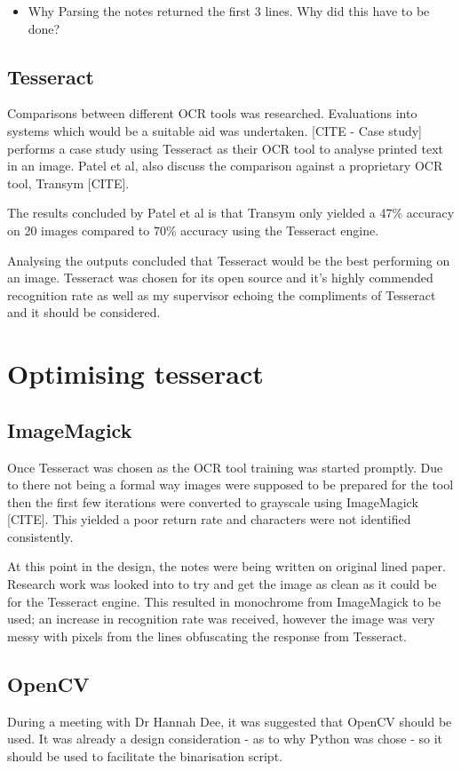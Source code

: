 \begin{itemize}
  \item Why Parsing the notes returned the first 3 lines. Why did this have to be done?

\end{itemize}

\subsection{Tesseract}
Comparisons between different OCR tools was researched. Evaluations into systems which would be a suitable aid was undertaken. [CITE - Case study] performs a case study using Tesseract as their OCR tool to analyse printed text in an image. Patel et al, also discuss the comparison against a proprietary OCR tool, Transym [CITE].

The results concluded by Patel et al is that Transym only yielded a 47\% accuracy on 20 images compared to 70\% accuracy using the Tesseract engine.

Analysing the outputs concluded that Tesseract would be the best performing on an image. Tesseract was chosen for its open source and it's highly commended recognition rate as well as my supervisor echoing the compliments of Tesseract and it should be considered.

\section{Optimising tesseract}

\subsection{ImageMagick}
Once Tesseract was chosen as the OCR tool training was started promptly. Due to there not being a formal way images were supposed to be prepared for the tool then the first few iterations were converted to grayscale using ImageMagick [CITE]. This yielded a poor return rate and characters were not identified consistently.

At this point in the design, the notes were being written on original lined paper. Research work was looked into to try and get the image as clean as it could be for the Tesseract engine. This resulted in monochrome from ImageMagick to be used; an increase in recognition rate was received, however the image was very messy with pixels from the lines obfuscating the response from Tesseract.

\subsection{OpenCV}
During a meeting with Dr Hannah Dee, it was suggested that OpenCV should be used. It was already a design consideration - as to why Python was chose - so it should be used to facilitate the binarisation script.

